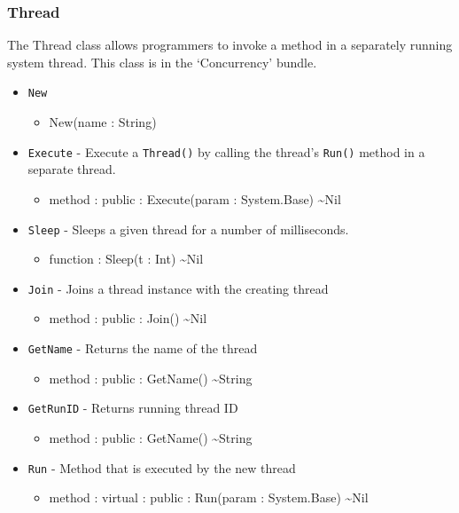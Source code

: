 \documentclass[11pt]{article}
\begin{document}
\subsubsection{Thread}
The Thread class allows programmers to invoke a method in a separately
running system thread.  This class is in the `Concurrency' bundle.  
\begin{itemize}
\item \texttt{New}
  \begin{itemize}
  \item New(name : String)
  \end{itemize}
\item \texttt{Execute} - Execute a \texttt{Thread()} by calling the
  thread's \texttt{Run()} method in a separate thread.
  \begin{itemize}
  \item method : public : Execute(param : System.Base) \textasciitilde Nil
  \end{itemize}
\item \texttt{Sleep} - Sleeps a given thread for a number of
  milliseconds.
  \begin{itemize}
  \item function : Sleep(t : Int) \textasciitilde Nil
  \end{itemize}
\item \texttt{Join} - Joins a thread instance with the creating thread
  \begin{itemize}
  \item method : public : Join() \textasciitilde Nil
  \end{itemize}
\item \texttt{GetName} - Returns the name of the thread
  \begin{itemize}
  \item method : public : GetName() \textasciitilde String
  \end{itemize}
\item \texttt{GetRunID} - Returns running thread ID
  \begin{itemize}
  \item method : public : GetName() \textasciitilde String
  \end{itemize}
\item \texttt{Run} - Method that is executed by the new thread
  \begin{itemize}
  \item method : virtual : public : Run(param : System.Base) \textasciitilde Nil
  \end{itemize}
\end{itemize}
\end{document}
